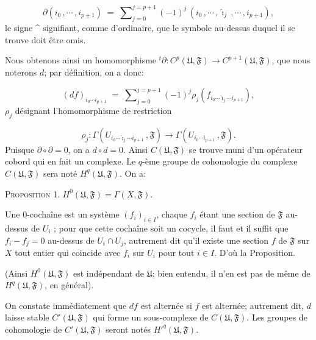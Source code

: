 \begin{equation*}
\partial(i_{0}\,, \cdots\,, i_{p+1}) \;=\; \sum\nolimits_{j=0}^{j=p+1} (-1)^{j}\, (i_{0}\,, \cdots\,, \hat{\imath}_{j}\,, \cdots\,, i_{p+1}),
\end{equation*}
le signe \^{} signifiant, comme d'ordinaire, que le symbole au-dessus duquel il se trouve doit être omis.

Nous obtenons ainsi un homomorphisme ${}^{t}\partial : C^{p}(\mathfrak{U}, \mathfrak{F}) \to C^{p+1}(\mathfrak{U}, \mathfrak{F})$, que nous noterons $d$; par définition, on a donc:

\begin{equation*}
(df)_{i_{0} \cdots i_{p+1}} \;=\; \sum\nolimits_{j=0}^{j=p+1} (-1)^{j}\rho_{j}(f_{i_{0} \cdots \hat{\imath}_{j} \cdots i_{p+1}}),
\end{equation*}
$\rho_{j}$ désignant l'homomorphisme de restriction

\begin{equation*}
\rho_{j} : \Gamma(U_{i_{0} \cdots \hat{\imath}_{j} \cdots i_{p+1}}\,, \mathfrak{F}) \to \Gamma(U_{i_{0} \cdots i_{p+1}}\,, \mathfrak{F}).
\end{equation*}
Puisque $\partial \circ \partial = 0$, on a $d \circ d = 0$. Ainsi $C(\mathfrak{U}, \mathfrak{F})$ se trouve muni d'un opérateur cobord qui en fait un complexe. Le $q$-ème groupe de cohomologie du complexe $C(\mathfrak{U}, \mathfrak{F})$ sera noté $H^{q}(\mathfrak{U}, \mathfrak{F})$. On a:

\textsc{Proposition} 1. $H^{0}(\mathfrak{U}, \mathfrak{F}) = \Gamma(X, \mathfrak{F})$.

Une 0-cochaîne est un système $(f_{i})_{i \in I}$, chaque $f_{i}$ étant une section de $\mathfrak{F}$ au-dessus de $U_{i}$ ; pour que cette cochaîne soit un cocycle, il faut et il suffit que $f_{i} - f_{j} = 0$ au-dessus de $U_{i} \cap U_{j}$, autrement dit qu'il existe une section $f$ de $\mathfrak{F}$ sur $X$ tout entier qui coincide avec $f_{i}$ sur $U_{i}$ pour tout $i \in I$. D'où la Proposition.

(Ainsi $H^{0}(\mathfrak{U}, \mathfrak{F})$ est indépendant de $\mathfrak{U}$; bien entendu, il n'en est pas de même de $H^{q}(\mathfrak{U}, \mathfrak{F})$, en général).

On constate immédiatement que $df$ est alternée si $f$ est alternée; autrement dit, $d$ laisse stable $C'(\mathfrak{U}, \mathfrak{F})$ qui forme un sous-complexe de $C(\mathfrak{U}, \mathfrak{F})$. Les groupes de cohomologie de $C'(\mathfrak{U}, \mathfrak{F})$ seront notés $H'^{q}(\mathfrak{U}, \mathfrak{F})$.


